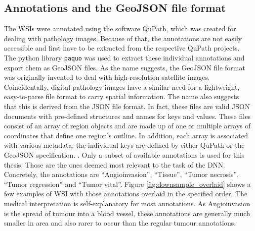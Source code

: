 \subsection{Annotations and the GeoJSON file format}

The WSIs were annotated using the software QuPath, which was created for dealing with pathology images. \cite{Bankhead2017QuPath} Because of that, the annotations are not easily accessible and first have to be extracted from the respective QuPath projects. 
The python library \verb|paquo| was used to extract these individual annotations and export them as GeoJSON files. As the name suggests, the GeoJSON file format was originally invented to deal with high-resolution satellite images. \cite{Butler2016GeoJSON} Coincidentally, digital pathology images have a similar need for a lightweight, easy-to-parse file format to carry spatial information. The name also suggests that this is derived from the JSON file format. In fact, these files are valid JSON documents with pre-defined structures and names for keys and values. These files consist of an array of region objects and are made up of one or multiple arrays of coordinates that define one region's outline. In addition, each array is associated with various metadata; the individual keys are defined by either QuPath or the GeoJSON specification. \cite{Butler2016GeoJSON, Bankhead2017QuPath}. Only a subset of available annotations is used for this thesis. Those are the ones deemed most relevant to the task of the DNN. Concretely, the annotations are “Angioinvasion”, “Tissue”, “Tumor necrosis”, “Tumor regression” and “Tumor vital”. Figure \ref{fig:downsample_overlaid} shows a few examples of WSI with those annotations overlaid in the specified order. The medical interpretation is self-explanatory for most annotations. As Angioinvasion is the spread of tumour into a blood vessel, these annotations are generally much smaller in area and also rarer to occur than the regular tumour annotations.

